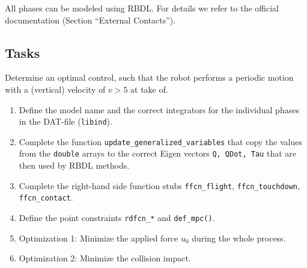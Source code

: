\documentclass[a4paper,english,12pt]{report}
\newcommand{\rbdl}[0]{\textsc{RBDL}}
\begin{document}
All phases can be modeled using \rbdl{}. For details we refer to the official documentation (Section "`External Contacts"').

\clearpage

\subsection*{Tasks}

Determine an optimal control, such that the robot performs a periodic motion with a (vertical) velocity of $v > 5$ at take of.

\begin{enumerate}
	\item Define the model name and the correct integrators for the individual phases in the
		DAT-file (\verb$libind$).
	\item Complete the function \verb$update_generalized_variables$ that
		copy the values from the \verb$double$ arrays to the correct Eigen
		vectors \verb$Q, QDot, Tau$ that are then used by \rbdl{} methods.
	\item Complete the right-hand side function stubs \verb$ffcn_flight$, \verb$ffcn_touchdown$,
		\verb$ffcn_contact$.
	\item Define the point constraints \verb$rdfcn_*$ and 
		\verb$def_mpc()$.
	\item Optimization 1: Minimize the applied force $u_0$ during the whole
		process.
	\item Optimization 2: Minimize the collision impact.
\end{enumerate}
\medskip
\end{document}
